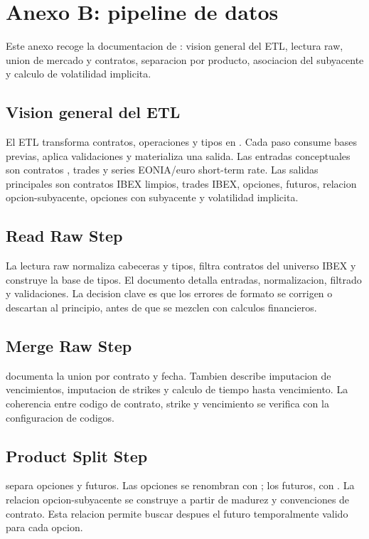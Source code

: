 \chapter{Anexo B: pipeline de datos}

Este anexo recoge la documentacion de : vision general del ETL, lectura raw, union de mercado y contratos, separacion por producto, asociacion del subyacente y calculo de volatilidad implicita.

\section{Vision general del ETL}

El ETL transforma contratos, operaciones y tipos en . Cada paso consume bases previas, aplica validaciones y materializa una salida. Las entradas conceptuales son contratos , trades  y series EONIA/euro short-term rate. Las salidas principales son contratos IBEX limpios, trades IBEX, opciones, futuros, relacion opcion-subyacente, opciones con subyacente y volatilidad implicita.

\section{Read Raw Step}

La lectura raw normaliza cabeceras y tipos, filtra contratos del universo IBEX y construye la base de tipos. El documento  detalla entradas, normalizacion, filtrado y validaciones. La decision clave es que los errores de formato se corrigen o descartan al principio, antes de que se mezclen con calculos financieros.

\section{Merge Raw Step}

 documenta la union por contrato y fecha. Tambien describe imputacion de vencimientos, imputacion de strikes y calculo de tiempo hasta vencimiento. La coherencia entre codigo de contrato, strike y vencimiento se verifica con la configuracion de codigos.

\section{Product Split Step}

 separa opciones y futuros. Las opciones se renombran con ; los futuros, con . La relacion opcion-subyacente se construye a partir de madurez y convenciones de contrato. Esta relacion permite buscar despues el futuro temporalmente valido para cada opcion.

